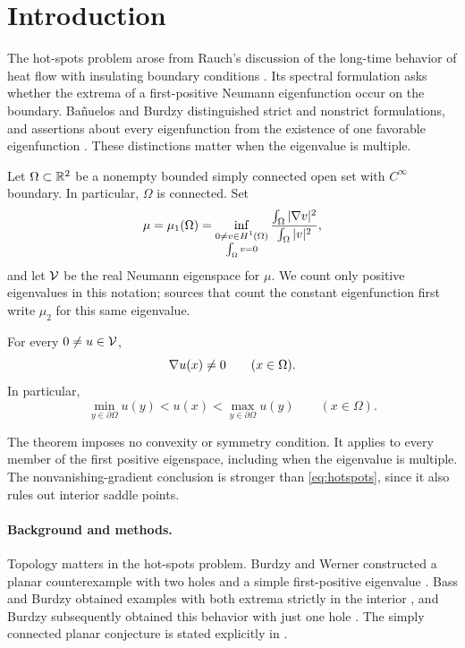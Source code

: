 \section{Introduction}

The hot-spots problem arose from Rauch's discussion of the long-time behavior of heat flow with insulating boundary conditions \cite{Rauch1975}. Its spectral formulation asks whether the extrema of a first-positive Neumann eigenfunction occur on the boundary. Bañuelos and Burdzy distinguished strict and nonstrict formulations, and assertions about every eigenfunction from the existence of one favorable eigenfunction \cite{BanuelosBurdzy1999}. These distinctions matter when the eigenvalue is multiple.

Let $\Omega\subset\mathbb R^2$ be a nonempty bounded simply connected open set with $C^\infty$ boundary. In particular, $\Omega$ is connected. Set
\begin{equation}\label{eq:mu}
\mu=\mu_1(\Omega)
=\inf_{\substack{0\ne v\in H^1(\Omega)\\ \int_\Omega v=0}}
\frac{\int_\Omega|\nabla v|^2}{\int_\Omega|v|^2},
\end{equation}
and let $\mathcal V$ be the real Neumann eigenspace for $\mu$. We count only positive eigenvalues in this notation; sources that count the constant eigenfunction first write $\mu_2$ for this same eigenvalue.

\begin{theorem}\label{thm:main}
For every $0\ne u\in\mathcal V$,
\[
\nabla u(x)\ne0\qquad(x\in\Omega).
\]
In particular,
\begin{equation}\label{eq:hotspots}
\min_{y\in\partial\Omega}u(y)<u(x)<\max_{y\in\partial\Omega}u(y)
\qquad(x\in\Omega).
\end{equation}
\end{theorem}

The theorem imposes no convexity or symmetry condition. It applies to every member of the first positive eigenspace, including when the eigenvalue is multiple. The nonvanishing-gradient conclusion is stronger than \eqref{eq:hotspots}, since it also rules out interior saddle points.

\paragraph{Background and methods.}
Topology matters in the hot-spots problem. Burdzy and Werner constructed a planar counterexample with two holes and a simple first-positive eigenvalue \cite{BurdzyWerner1999}. Bass and Burdzy obtained examples with both extrema strictly in the interior \cite{BassBurdzy2000}, and Burdzy subsequently obtained this behavior with just one hole \cite{Burdzy2005}. The simply connected planar conjecture is stated explicitly in \cite[Conjecture~1.2(ii)]{Burdzy2005}.

